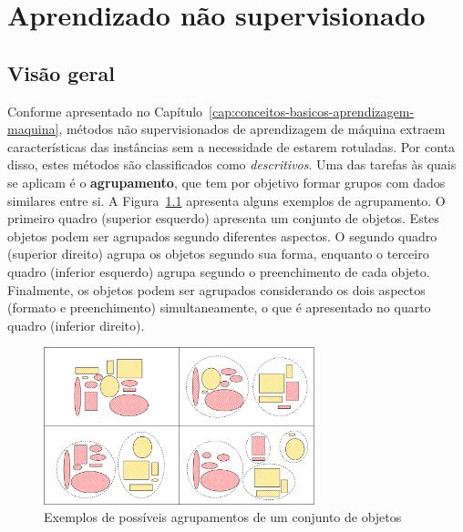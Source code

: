\chapter{Aprendizado não supervisionado}


\section{Visão geral}

Conforme apresentado no Capítulo~\ref{cap:conceitos-basicos-aprendizagem-maquina}, métodos não supervisionados de aprendizagem de máquina extraem características das instâncias sem a necessidade de estarem rotuladas. Por conta disso, estes métodos são classificados como \textit{descritivos}. Uma das tarefas às quais se aplicam é o \textbf{agrupamento}, que tem por objetivo formar grupos com dados similares entre si. A Figura~\ref{fig:exemplos-agrupamentos} apresenta alguns exemplos de agrupamento. O primeiro quadro (superior esquerdo) apresenta um conjunto de objetos. Estes objetos podem ser agrupados segundo diferentes aspectos. O segundo quadro (superior direito) agrupa os objetos segundo sua forma, enquanto o terceiro quadro (inferior esquerdo) agrupa segundo o preenchimento de cada objeto. Finalmente, os objetos podem ser agrupados considerando os dois aspectos (formato e preenchimento) simultaneamente, o que é apresentado no quarto quadro (inferior direito).

\begin{figure}
	\centering
	\includegraphics[width=0.7\textwidth]{img/exemplos-agrupamentos}
	\caption{Exemplos de possíveis agrupamentos de um conjunto de objetos}
	\label{fig:exemplos-agrupamentos}
\end{figure}

